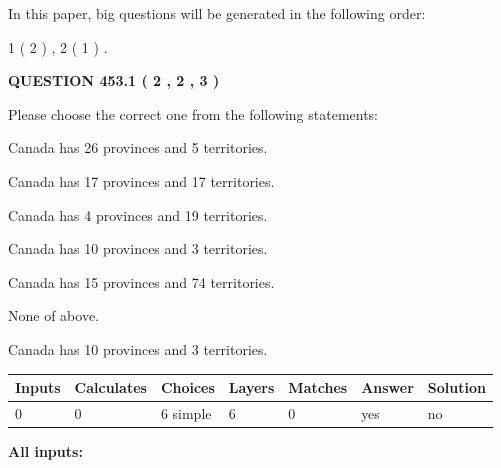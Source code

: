 \documentclass[12pt]{article}
\begin{document}
In this paper, big questions will be generated in the following order: 
   
   
   1 ( 2 )
 ,
   2 ( 1 )
 .
  
\vspace{0.2in}
  
{\textbf{\Large{QUESTION
453.1 
 ( 2 , 2 , 3 )
}}}
  
  
Please choose the correct one from the following statements:
 
 
Canada has  26 provinces and  5 territories.
 
 
Canada has  17 provinces and  17 territories.
 
 
Canada has   4 provinces and  19 territories.
 
 
Canada has 10  provinces and 3 territories.
 
 
Canada has  15 provinces and  74 territories.
 
 
 None of above.
 
 
\noindent{}
 
 
Canada has 10  provinces and 3 territories.
 
 
\noindent{}
 
 
   
   
   
   
\noindent\begin{tabular}{|l|l|l|l|l|l|l|}
 \hline
Inputs & Calculates & Choices & Layers & Matches & Answer & Solution \\ \hline
 0  & 
 0  & 
 6
  simple  
  & 
 6  & 
 0  & 
  yes & 
  no 
  \\ \hline
 \end{tabular}
   
   
   
   
\noindent{}
   
   
   
   
\noindent\vspace{0.1in}\hspace{-0.08in} {\textbf{\Large{All inputs: }}}
   
\end{document}

